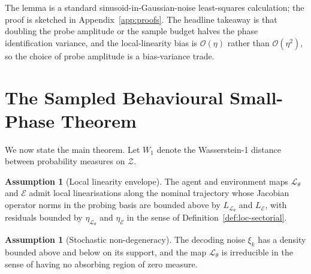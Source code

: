 \documentclass[11pt,a4paper]{article}
\theoremstyle{definition}
\newtheorem{assumption}[theorem]{Assumption}
\theoremstyle{remark}
\newcommand{\embspace}{\mathcal{Z}}
\newcommand{\agent}{\mathcal{L}_{\theta}}
\newcommand{\env}{\mathcal{E}}
\begin{document}
The lemma is a standard sinusoid-in-Gaussian-noise least-squares
calculation; the proof is sketched in
Appendix~\ref{app:proofs}.  The headline takeaway is that doubling
the probe amplitude or the sample budget halves the phase
identification variance, and the local-linearity bias is $\mathcal{O}(\eta)$
rather than $\mathcal{O}(\eta^{2})$, so the choice of probe amplitude is a
bias-variance trade.

\section{The Sampled Behavioural Small-Phase Theorem}\label{sec:theorem}

We now state the main theorem.  Let $W_{1}$ denote the Wasserstein-1
distance between probability measures on $\embspace$.

\begin{assumption}[Local linearity envelope]\label{a:env}
The agent and environment maps $\agent$ and $\env$ admit local
linearisations along the nominal trajectory whose Jacobian operator
norms in the probing basis are bounded above by $L_{\agent}$ and
$L_{\env}$, with residuals bounded by $\eta_{\agent}$ and $\eta_{\env}$ in
the sense of Definition~\ref{def:loc-sectorial}.
\end{assumption}

\begin{assumption}[Stochastic non-degeneracy]\label{a:stoch}
The decoding noise $\xi_{k}$ has a density bounded above and below on
its support, and the map $\agent$ is irreducible in the sense of having
no absorbing region of zero measure.
\end{assumption}
\end{document}
